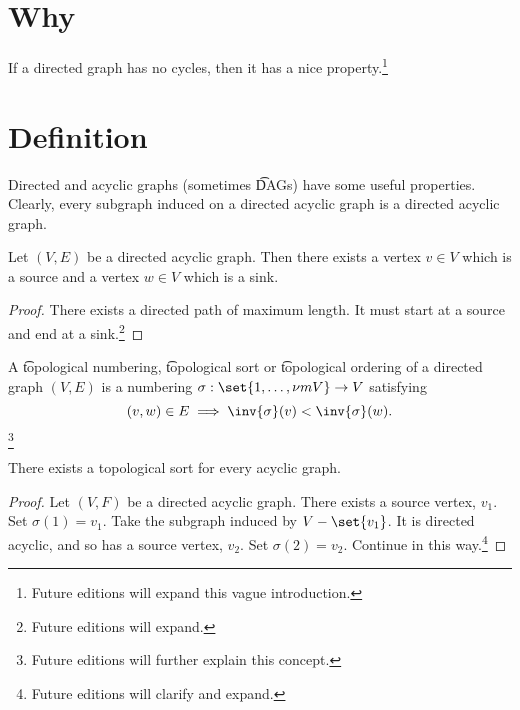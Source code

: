 

\section*{Why}

If a directed graph has no cycles, then it has a nice property.\footnote{Future editions will expand this vague introduction.}

\section*{Definition}

Directed and acyclic graphs (sometimes \t{DAGs}) have some useful properties.
Clearly, every subgraph induced on a directed acyclic graph is a directed acyclic graph.

\begin{proposition}
Let $(V, E)$ be a directed acyclic graph. Then there exists a vertex $v \in V$ which is a source and a vertex $w \in V$ which is a sink.
\begin{proof}There exists a directed path of maximum length. It must start at a source and end at a sink.\footnote{Future editions will expand.}\end{proof}\end{proposition}
A \t{topological numbering}, \t{topological sort} or \t{topological ordering} of a directed graph $(V, E)$ is a numbering $\sigma : \set{1, \dots , \nu m{V}} \to V$ satisfying
    \[
(v, w) \in E \implies \inv{\sigma }(v) < \inv{\sigma }(w).
    \]\footnote{Future editions will further explain this concept.}

\begin{proposition}
There exists a topological sort for every acyclic graph.
\begin{proof}Let $(V, F)$ be a directed acyclic graph.
There exists a source vertex, $v_1$.
Set $\sigma (1) = v_1$.
Take the subgraph induced by $V - \set{v_1}$.
It is directed acyclic, and so has a source vertex, $v_2$.
Set $\sigma (2) = v_2$.
Continue in this way.\footnote{Future editions will clarify and expand.}\end{proof}\end{proposition}
\blankpage